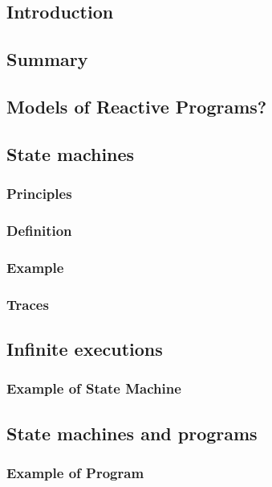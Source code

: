 \documentclass[12pt, a4paper]{book}
\begin{document}
  \subsection{Introduction}
  \label{sub:Introduction}
  \subsection{Summary}
  \label{sub:Summary}
  \subsection{Models of Reactive Programs?}
  \label{sub:Models of Reactive Programs?}
  \subsection{State machines}
  \label{sub:State machines}
  \subsubsection{Principles}
  \label{subs:Principles}
  \subsubsection{Definition}
  \label{subs:Definition}
  \subsubsection{Example}
  \label{subs:Example}
  \subsubsection{Traces}
  \label{subs:Traces}
  \subsection{Infinite executions}
  \label{sub:Infinite executions}
  \subsubsection{Example of State Machine}
  \label{subs:Example of State Machine}
  \subsection{State machines and programs}
  \label{sub:State machines and programs}
  \subsubsection{Example of Program}
  \label{subs:Example of Program}
\end{document}
